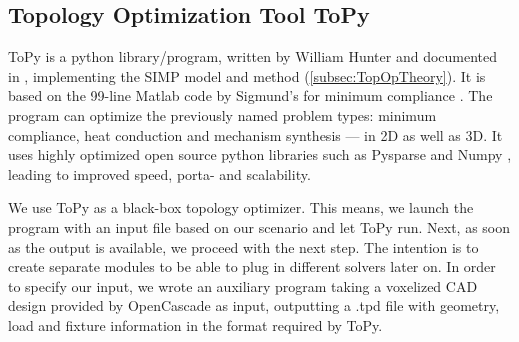\subsection{Topology Optimization Tool ToPy}
ToPy \cite{ToPy} is a python library/program, written by William Hunter and documented in \cite{Hunter2009}, implementing the SIMP model and method (\autoref{subsec:TopOpTheory}). It is based on the 99-line Matlab code by Sigmund's for minimum compliance \cite{sigmund200199}. The program can optimize the previously named problem types: minimum compliance, heat conduction and mechanism synthesis --- in 2D as well as 3D. It uses highly optimized open source python libraries such as Pysparse \cite{Pysparse} and Numpy \cite{Numpy}, leading to improved speed, porta- and scalability. %


We use ToPy as a black-box topology optimizer. This means, we launch the program with an input file based on our scenario and let ToPy run. Next, as soon as the output is available, we proceed with the next step. The intention is to create separate modules to be able to plug in different solvers later on. In order to specify our input, we wrote an auxiliary program taking a voxelized CAD design provided by OpenCascade as input, outputting a .tpd file with geometry, load and fixture information in the format required by ToPy. 
